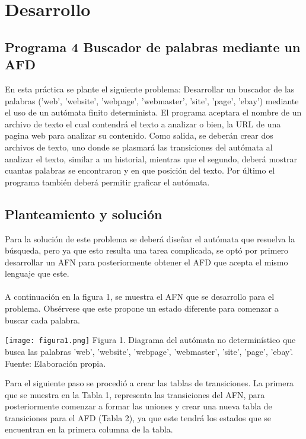 \documentclass{article}
\begin{document}
	\section{Desarrollo}
	
	\subsection{Programa 4 Buscador de palabras mediante un AFD}
	
	En esta práctica se plante el siguiente problema: Desarrollar un buscador de las palabras ('web', 'website', 'webpage', 'webmaster', 'site', 'page', 'ebay') mediante el uso de un autómata finito determinista. El programa aceptara el nombre de un archivo de texto el cual contendrá el texto a analizar o bien, la URL de una pagina web para analizar su contenido. Como salida, se deberán crear dos archivos de texto, uno donde se plasmará las transiciones del autómata al analizar el texto, similar a un historial, mientras que el segundo, deberá mostrar cuantas palabras se encontraron y en que posición del texto. Por último el programa también deberá permitir graficar el autómata.
	
	\subsection{Planteamiento y solución}
	
	Para la solución de este problema se deberá diseñar el autómata que resuelva la búsqueda, pero ya que esto resulta una tarea complicada, se optó por primero desarrollar un AFN para posteriormente obtener el AFD que acepta el mismo lenguaje que este.
	\\\\A continuación en la figura 1, se muestra el AFN que se desarrollo para el problema. Obsérvese que este propone un estado diferente para comenzar a buscar cada palabra.
	
	\begin{center}
		\texttt{[image: figura1.png]}
		\small Figura 1. Diagrama del autómata no determinístico que busca las palabras 'web', 'website', 'webpage', 'webmaster', 'site', 'page', 'ebay'. Fuente: Elaboración propia.
	\end{center}
	
	Para el siguiente paso se procedió a crear las tablas de transiciones. La primera que se muestra en la Tabla 1, representa las transiciones del AFN, para posteriormente comenzar a formar las uniones y crear una nueva tabla de transiciones para el AFD (Tabla 2), ya que este tendrá los estados que se encuentran en la primera columna de la tabla.
	
\end{document}

